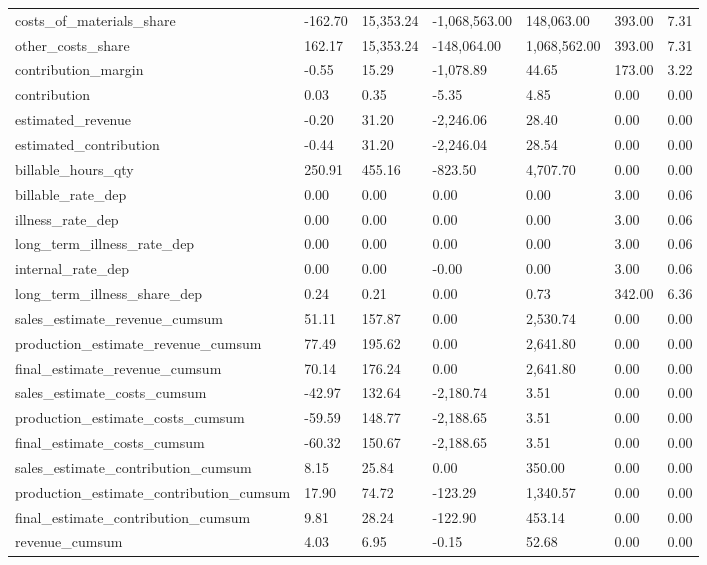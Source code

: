 \begin{landscape}
\begin{longtable}{lllllll}
costs\_of\_materials\_share & -162.70 & 15,353.24 & -1,068,563.00 & 148,063.00 & 393.00 & 7.31 \\
other\_costs\_share & 162.17 & 15,353.24 & -148,064.00 & 1,068,562.00 & 393.00 & 7.31 \\
contribution\_margin & -0.55 & 15.29 & -1,078.89 & 44.65 & 173.00 & 3.22 \\
contribution & 0.03 & 0.35 & -5.35 & 4.85 & 0.00 & 0.00 \\
estimated\_revenue & -0.20 & 31.20 & -2,246.06 & 28.40 & 0.00 & 0.00 \\
estimated\_contribution & -0.44 & 31.20 & -2,246.04 & 28.54 & 0.00 & 0.00 \\
billable\_hours\_qty & 250.91 & 455.16 & -823.50 & 4,707.70 & 0.00 & 0.00 \\
billable\_rate\_dep & 0.00 & 0.00 & 0.00 & 0.00 & 3.00 & 0.06 \\
illness\_rate\_dep & 0.00 & 0.00 & 0.00 & 0.00 & 3.00 & 0.06 \\
long\_term\_illness\_rate\_dep & 0.00 & 0.00 & 0.00 & 0.00 & 3.00 & 0.06 \\
internal\_rate\_dep & 0.00 & 0.00 & -0.00 & 0.00 & 3.00 & 0.06 \\
long\_term\_illness\_share\_dep & 0.24 & 0.21 & 0.00 & 0.73 & 342.00 & 6.36 \\
sales\_estimate\_revenue\_cumsum & 51.11 & 157.87 & 0.00 & 2,530.74 & 0.00 & 0.00 \\
production\_estimate\_revenue\_cumsum & 77.49 & 195.62 & 0.00 & 2,641.80 & 0.00 & 0.00 \\
final\_estimate\_revenue\_cumsum & 70.14 & 176.24 & 0.00 & 2,641.80 & 0.00 & 0.00 \\
sales\_estimate\_costs\_cumsum & -42.97 & 132.64 & -2,180.74 & 3.51 & 0.00 & 0.00 \\
production\_estimate\_costs\_cumsum & -59.59 & 148.77 & -2,188.65 & 3.51 & 0.00 & 0.00 \\
final\_estimate\_costs\_cumsum & -60.32 & 150.67 & -2,188.65 & 3.51 & 0.00 & 0.00 \\
sales\_estimate\_contribution\_cumsum & 8.15 & 25.84 & 0.00 & 350.00 & 0.00 & 0.00 \\
production\_estimate\_contribution\_cumsum & 17.90 & 74.72 & -123.29 & 1,340.57 & 0.00 & 0.00 \\
final\_estimate\_contribution\_cumsum & 9.81 & 28.24 & -122.90 & 453.14 & 0.00 & 0.00 \\
revenue\_cumsum & 4.03 & 6.95 & -0.15 & 52.68 & 0.00 & 0.00 \\

\end{longtable}
\end{landscape}

